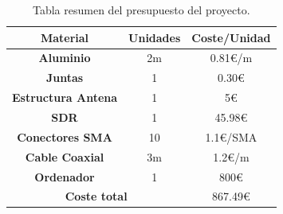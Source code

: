 \documentclass[a4paper,openright,12pt]{article}
\begin{document}
\begin{table}[h!]
\centering
\begin{tabular}{|c|c|c|} 
\hline
\textbf{Material}          & \textbf{Unidades} & \textbf{Coste/Unidad}            \\ 
\hline
\textbf{Aluminio}          & 2m                & 0.81\euro{}/m   \\ 
\hline
\textbf{Juntas}            & 1                 & 0.30\euro{}     \\ 
\hline
\textbf{Estructura Antena} & 1                 & 5\euro{}        \\ 
\hline
\textbf{SDR}               & 1                 & 45.98\euro{}    \\ 
\hline
\textbf{Conectores SMA}    & 10                & 1.1\euro{}/SMA  \\ 
\hline
\textbf{Cable Coaxial}     & 3m                & 1.2\euro{}/m    \\ 
\hline
\textbf{Ordenador}               & 1                 & 800\euro{}    \\ 
\hline
\multicolumn{2}{|c|}{\textbf{Coste total}}              & 867.49\euro{}    \\
\hline

\end{tabular}
\caption{Tabla resumen del presupuesto del proyecto.}
\label{Tab3:Presupuesto}
\end{table}

\newpage
\end{document}
